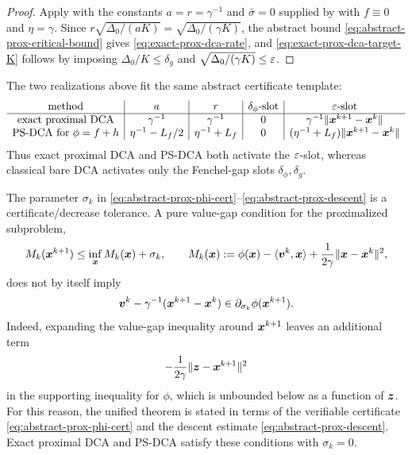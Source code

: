 \begin{proof}
Apply  with the constants
$a=r=\gamma^{-1}$ and $\bar\sigma=0$ supplied by
 with $f\equiv0$ and $\eta=\gamma$. Since
$r\sqrt{\Delta_0/(aK)}=\sqrt{\Delta_0/(\gamma K)}$, the abstract bound
\eqref{eq:abstract-prox-critical-bound} gives
\eqref{eq:exact-prox-dca-rate}, and
\eqref{eq:exact-prox-dca-target-K} follows by imposing
$\Delta_0/K\le\delta_g$ and $\sqrt{\Delta_0/(\gamma K)}\le\varepsilon$.
\end{proof}

\begin{remark}
\label{rem:prox-realization-table}
The two realizations above fit the same abstract certificate template:
\[
\begin{array}{c|c|c|c|c}
\text{method}
& a
& r
& \delta_\phi\text{-slot}
& \varepsilon\text{-slot}
\\ \hline
\text{exact proximal DCA}
& \gamma^{-1}
& \gamma^{-1}
& 0
& \gamma^{-1}\|\bm{x}^{k+1}-\bm{x}^k\|
\\
\text{PS-DCA for }\phi=f+h
& \eta^{-1}-L_f/2
& \eta^{-1}+L_f
& 0
& (\eta^{-1}+L_f)\|\bm{x}^{k+1}-\bm{x}^k\|
\end{array}
\]
Thus exact proximal DCA and PS-DCA both activate the $\varepsilon$-slot,
whereas classical bare DCA activates only the Fenchel-gap slots
$\delta_\phi,\delta_g$.
\end{remark}

\begin{remark}
\label{rem:prox-value-gap-warning}
The parameter $\sigma_k$ in
\eqref{eq:abstract-prox-phi-cert}--\eqref{eq:abstract-prox-descent} is a
certificate/decrease tolerance. A pure value-gap condition for the
proximalized subproblem,
\[
    M_k(\bm{x}^{k+1})\le\inf_{\bm{x}}M_k(\bm{x})+\sigma_k,
    \qquad
    M_k(\bm{x}):=
    \phi(\bm{x})-\langle\bm{v}^k,\bm{x}\rangle
    +
    \frac{1}{2\gamma}\|\bm{x}-\bm{x}^k\|^2,
\]
does not by itself imply
\[
    \bm{v}^k-\gamma^{-1}(\bm{x}^{k+1}-\bm{x}^k)
    \in
    \partial_{\sigma_k}\phi(\bm{x}^{k+1}).
\]
Indeed, expanding the value-gap inequality around $\bm{x}^{k+1}$ leaves an
additional term
\[
    -\frac{1}{2\gamma}\|\bm{z}-\bm{x}^{k+1}\|^2
\]
in the supporting inequality for $\phi$, which is unbounded below as a
function of $\bm{z}$. For this reason, the unified theorem is stated in
terms of the verifiable certificate
\eqref{eq:abstract-prox-phi-cert} and the descent estimate
\eqref{eq:abstract-prox-descent}. Exact proximal DCA and PS-DCA satisfy
these conditions with $\sigma_k=0$.
\end{remark}

